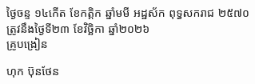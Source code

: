 \documentclass[a4paper,10pt]{article}
\begin{document}
\vspace{2pt}
\hfill
\begin{minipage}{9.8cm}
  {\centering
    ថ្ងៃចន្ទ ១៤កើត ខែកត្តិក ឆ្នាំមមី អដ្ឋស័ក ពុទ្ធសករាជ ២៥៧០\\[2pt]
    ត្រូវនឹងថ្ងៃទី២៣ ខែវិច្ឆិកា ឆ្នាំ២០២៦\\[3pt]
    {\muol គ្រូបង្រៀន}\par}
  \vspace{32pt}
  \hfill{\muol ហុក ប៊ុនថែន}\hspace*{1.4cm}
\end{minipage}
\end{document}
